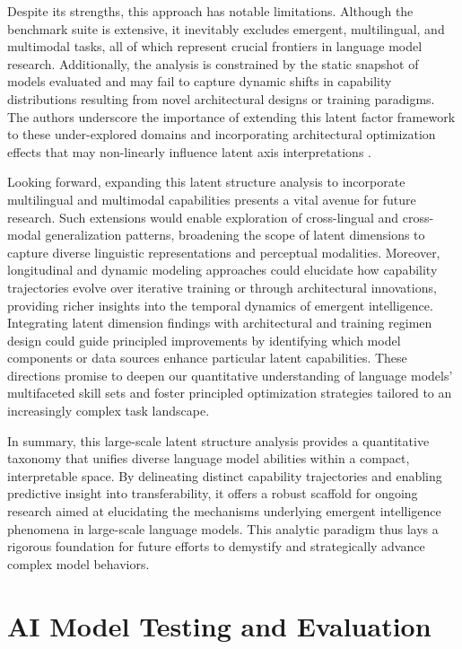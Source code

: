 \documentclass[sigconf]{acmart}
\begin{document}
Despite its strengths, this approach has notable limitations. Although the benchmark suite is extensive, it inevitably excludes emergent, multilingual, and multimodal tasks, all of which represent crucial frontiers in language model research. Additionally, the analysis is constrained by the static snapshot of models evaluated and may fail to capture dynamic shifts in capability distributions resulting from novel architectural designs or training paradigms. The authors underscore the importance of extending this latent factor framework to these under-explored domains and incorporating architectural optimization effects that may non-linearly influence latent axis interpretations \cite{ref45}.

Looking forward, expanding this latent structure analysis to incorporate multilingual and multimodal capabilities presents a vital avenue for future research. Such extensions would enable exploration of cross-lingual and cross-modal generalization patterns, broadening the scope of latent dimensions to capture diverse linguistic representations and perceptual modalities. Moreover, longitudinal and dynamic modeling approaches could elucidate how capability trajectories evolve over iterative training or through architectural innovations, providing richer insights into the temporal dynamics of emergent intelligence. Integrating latent dimension findings with architectural and training regimen design could guide principled improvements by identifying which model components or data sources enhance particular latent capabilities. These directions promise to deepen our quantitative understanding of language models’ multifaceted skill sets and foster principled optimization strategies tailored to an increasingly complex task landscape.

In summary, this large-scale latent structure analysis provides a quantitative taxonomy that unifies diverse language model abilities within a compact, interpretable space. By delineating distinct capability trajectories and enabling predictive insight into transferability, it offers a robust scaffold for ongoing research aimed at elucidating the mechanisms underlying emergent intelligence phenomena in large-scale language models. This analytic paradigm thus lays a rigorous foundation for future efforts to demystify and strategically advance complex model behaviors.

\section{AI Model Testing and Evaluation}
\end{document}
